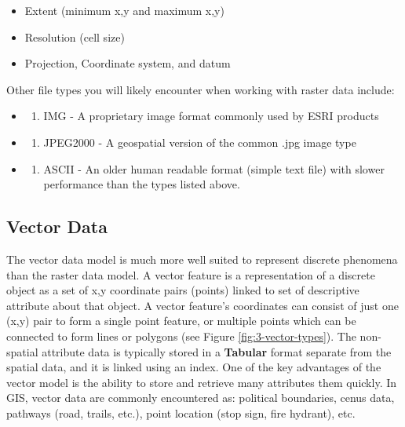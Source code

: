 \documentclass[
]{book}
\providecommand{\tightlist}{%
  \setlength{\itemsep}{0pt}\setlength{\parskip}{0pt}}
\begin{document}
\begin{itemize}
\tightlist
\item
  Extent (minimum x,y and maximum x,y)
\item
  Resolution (cell size)
\item
  Projection, Coordinate system, and datum
\end{itemize}

Other file types you will likely encounter when working with raster data include:

\begin{itemize}
\tightlist
\item
  \begin{enumerate}
  \def\labelenumi{\arabic{enumi})}
  \tightlist
  \item
    IMG - A proprietary image format commonly used by ESRI products
  \end{enumerate}
\item
  \begin{enumerate}
  \def\labelenumi{\arabic{enumi})}
  \setcounter{enumi}{1}
  \tightlist
  \item
    JPEG2000 - A geospatial version of the common .jpg image type
  \end{enumerate}
\item
  \begin{enumerate}
  \def\labelenumi{\arabic{enumi})}
  \setcounter{enumi}{2}
  \tightlist
  \item
    ASCII - An older human readable format (simple text file) with slower performance than the types listed above.
  \end{enumerate}
\end{itemize}

\subsection{Vector Data}\label{vector-data}

The vector data model is much more well suited to represent discrete phenomena than the raster data model. A vector feature is a representation of a discrete object as a set of x,y coordinate pairs (points) linked to set of descriptive attribute about that object. A vector feature's coordinates can consist of just one (x,y) pair to form a single point feature, or multiple points which can be connected to form lines or polygons (see Figure \ref{fig:3-vector-types}). The non-spatial attribute data is typically stored in a \textbf{Tabular} format separate from the spatial data, and it is linked using an index. One of the key advantages of the vector model is the ability to store and retrieve many attributes them quickly. In GIS, vector data are commonly encountered as: political boundaries, cenus data, pathways (road, trails, etc.), point location (stop sign, fire hydrant), etc.
\end{document}
